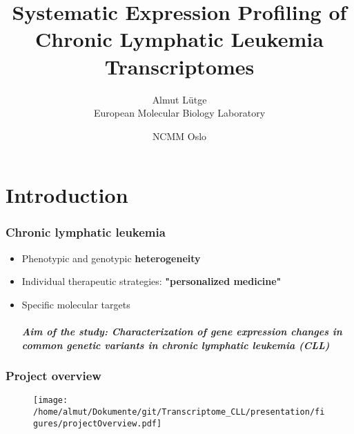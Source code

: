 \documentclass[xcolor=dvipsnames,t,10pt]{beamer}
\title[Expression profiling CLL]{Systematic Expression Profiling of Chronic Lymphatic Leukemia Transcriptomes}
\author[Almut Lütge - European Molecular Biology Laboratory]{Almut Lütge\\European Molecular Biology Laboratory}
\date{NCMM Oslo \\ \bigskip {\monthyeardate{\today}}}
\begin{document}
\begin{frame}
  \titlepage
\end{frame}

%
%
%
%
\section{Introduction}
%
\begin{frame}[c]
	\frametitle{Chronic lymphatic leukemia}
	\begin{itemize}
	\item Phenotypic and genotypic \textbf{heterogeneity} 
	\item Individual therapeutic strategies: \textbf{"personalized medicine"}
	\item Specific molecular targets 
	\\~\\
	\textbf{\textit{Aim of the study: Characterization of gene expression changes in common genetic variants in chronic lymphatic leukemia  (CLL)}}
	\end{itemize}
\end{frame}
%
%
\begin{frame}[c]
\frametitle{Project overview}
\begin{figure}
\centering
\texttt{[image: /home/almut/Dokumente/git/Transcriptome\_CLL/presentation/figures/projectOverview.pdf]}
\end{figure}
\end{frame}
\end{document}
